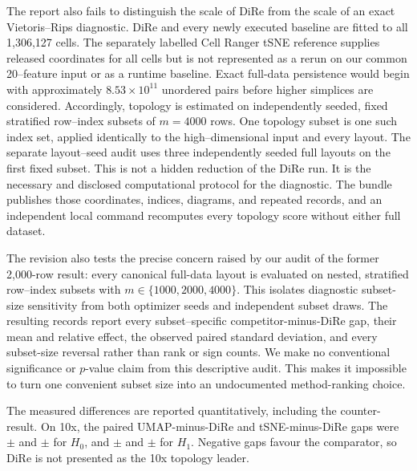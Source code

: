 \documentclass[11pt]{article}
\begin{document}
The report also fails to distinguish the scale of DiRe from the scale of an
exact Vietoris--Rips diagnostic. DiRe and every newly executed baseline are
fitted to all 1,306,127 cells. The separately labelled Cell Ranger tSNE
reference supplies released coordinates for all cells but is not represented
as a rerun on our common 20--feature input or as a runtime baseline. Exact
full-data persistence would begin with approximately $8.53\times 10^{11}$
unordered pairs before higher simplices are considered.
Accordingly, topology is estimated on \TopologySubsetCount{} independently
seeded, fixed stratified row--index subsets of $m=4000$ rows. One topology
subset is one such index set, applied identically to the high--dimensional input
and every layout. The separate layout--seed audit uses three independently
seeded full layouts on the first fixed subset. This is not a
hidden reduction of the DiRe run. It is the necessary and disclosed
computational protocol for the diagnostic. The bundle publishes those
coordinates, indices, diagrams, and repeated records, and an independent local
command recomputes every topology score without either full dataset.

The revision also tests the precise concern raised by our audit of the former
2,000-row result: every canonical full-data layout is evaluated on nested,
stratified row--index subsets with $m\in\{1000,2000,4000\}$. This isolates
diagnostic subset-size sensitivity from both optimizer seeds and independent
subset draws. The resulting records report every subset--specific
competitor-minus-DiRe gap, their mean and relative effect, the observed paired
standard deviation, and every subset-size reversal rather than rank or sign
counts. We make no
conventional significance or $p$-value claim from this descriptive audit. This makes it
impossible to turn one convenient subset size into an undocumented
method-ranking choice.

The measured differences are reported quantitatively, including the
counter-result. On 10x, the paired UMAP-minus-DiRe and tSNE-minus-DiRe gaps
were
\TenxUmapMinusDireBetaZeroDtwGap{}$\pm$
\TenxUmapMinusDireBetaZeroDtwGapSd{} and
\TenxTsneMinusDireBetaZeroDtwGap{}$\pm$
\TenxTsneMinusDireBetaZeroDtwGapSd{} for $H_0$, and
\TenxUmapMinusDireBetaOneDtwGap{}$\pm$
\TenxUmapMinusDireBetaOneDtwGapSd{} and
\TenxTsneMinusDireBetaOneDtwGap{}$\pm$
\TenxTsneMinusDireBetaOneDtwGapSd{} for $H_1$. Negative gaps favour the
comparator, so DiRe is not presented as the 10x topology leader.
\end{document}
